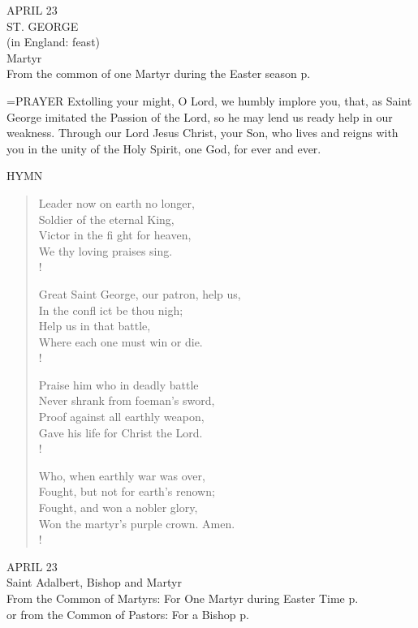 \begin{center}\normalsize APRIL 23\\
\footnotesize ST. GEORGE\\
\footnotesize (in England: feast)\\
\footnotesize Martyr\\
\footnotesize From the common of one Martyr during the Easter season p. \\
\end{center}

\hangindent=\parindent \small{PRAYER 
Extolling your might, O Lord,
we humbly implore you,
that, as Saint George imitated the Passion of the Lord,
so he may lend us ready help in our weakness.
Through our Lord Jesus Christ, your Son,
who lives and reigns with you in the unity of the Holy Spirit,
one God, for ever and ever.\\}
 
\noindent\small{\uppercase{Hymn}}\normalsize\label{proper:george:hymn}
\begin{verse}
Leader now on earth no longer,\\
Soldier of the eternal King,\\
Victor in the fi ght for heaven,\\
We thy loving praises sing.\\!

Great Saint George, our patron, help us,\\
In the confl ict be thou nigh;\\
Help us in that battle,\\
Where each one must win or die.\\!

Praise him who in deadly battle\\
Never shrank from foeman’s sword,\\
Proof against all earthly weapon,\\
Gave his life for Christ the Lord.\\!

Who, when earthly war was over,\\
Fought, but not for earth’s renown;\\
Fought, and won a nobler glory,\\
Won the martyr’s purple crown. Amen.\\!
\end{verse}

\begin{center}\normalsize APRIL 23\\
\footnotesize Saint Adalbert, Bishop and Martyr\\
\footnotesize From the Common of Martyrs: For One Martyr during Easter Time p.   \\
\footnotesize or  from the Common of Pastors: For a Bishop p.    \\
\end{center}

